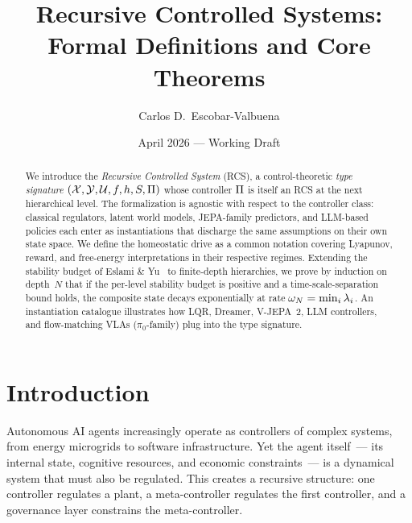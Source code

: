 \documentclass[11pt,a4paper]{article}
\title{Recursive Controlled Systems:\\
Formal Definitions and Core Theorems}
\author{Carlos D.\ Escobar-Valbuena}
\date{April 2026 --- Working Draft}
\begin{document}
\maketitle

\begin{abstract}
We introduce the \emph{Recursive Controlled System} (RCS), a control-theoretic
\emph{type signature} $(\mathcal{X}, \mathcal{Y}, \mathcal{U}, f, h, S, \Pi)$ whose
controller $\Pi$ is itself an RCS at the next hierarchical level.  The
formalization is agnostic with respect to the controller class: classical
regulators, latent world models, JEPA-family predictors, and LLM-based
policies each enter as instantiations that discharge the same assumptions on
their own state space.  We define the homeostatic drive as a common notation
covering Lyapunov, reward, and free-energy interpretations in their
respective regimes.  Extending the stability budget of Eslami \&
Yu~\cite{eslami2026control} to finite-depth hierarchies, we prove by
induction on depth~$N$ that if the per-level stability budget is positive
and a time-scale-separation bound holds, the composite state decays
exponentially at rate $\omega_N = \min_i \lambda_i$.  An instantiation
catalogue illustrates how LQR, Dreamer, V-JEPA~2, LLM controllers, and
flow-matching VLAs ($\pi_0$-family) plug into the type signature.
\end{abstract}

\tableofcontents
\newpage

\section{Introduction}
\label{sec:introduction}

Autonomous AI agents increasingly operate as controllers of complex
systems, from energy microgrids to software infrastructure.  Yet the
agent itself~--- its internal state, cognitive resources, and economic
constraints~--- is a dynamical system that must also be regulated.
This creates a recursive structure: one controller regulates a plant, a
meta-controller regulates the first controller, and a governance layer
constrains the meta-controller.
\end{document}
